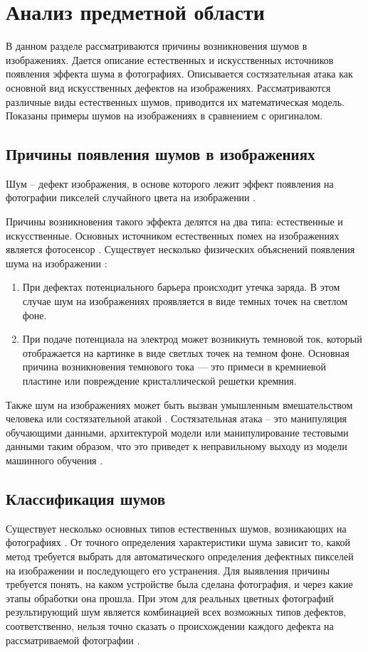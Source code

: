 \section{Анализ предметной области}

В данном разделе рассматриваются причины возникновения шумов в изображениях. 
Дается описание естественных и искусственных источников появления эффекта шума в фотографиях.
Описывается состязательная атака как основной вид искусственных дефектов на изображениях.
Рассматриваются различные виды естественных шумов, приводится их математическая модель.
Показаны примеры шумов на изображениях в сравнением с оригиналом.


\subsection{Причины появления шумов в изображениях}
Шум -- дефект изображения, в основе которого лежит эффект появления на фотографии пикселей случайного цвета на изображении \cite{shum}. 

Причины возникновения такого эффекта делятся на два типа: естественные и искусственные.
Основных источником естественных помех на изображениях является фотосенсор \cite{shum}.
Существует несколько физических объяснений появления шума на изображении \cite{causes}:
\begin{enumerate}
	\item При дефектах потенциального барьера происходит утечка заряда. В этом случае шум на изображениях проявляется в виде темных точек на светлом фоне.
	\item При подаче потенциала на электрод может возникнуть темновой ток, который отображается на картинке в виде светлых точек на темном фоне. Основная причина возникновения темнового тока — это примеси в кремниевой пластине или повреждение кристаллической решетки кремния. 
\end{enumerate}

Также шум на изображениях может быть вызван умышленным вмешательством человека или состязательной атакой \cite{impact}. 
Состязательная атака – это манипуляция обучающими данными, архитектурой модели или манипулирование тестовыми данными таким
образом, что это приведет к неправильному выходу из модели машинного обучения \cite{impact}.

\subsection{Классификация шумов}
Существует несколько основных типов естественных шумов, возникающих на фотографиях \cite{filterTechincs}.
От точного определения характеристики шума зависит то, какой метод требуется выбрать для автоматического определения дефектных пикселей на изображении и последующего его устранения.
Для выявления причины требуется понять, на каком устройстве была сделана фотография, и через какие этапы обработки она прошла.
При этом для реальных цветных фотографий результирующий шум является комбинацией всех возможных типов дефектов, соответственно, нельзя точно сказать о происхождении каждого дефекта на рассматриваемой фотографии \cite{mix}.

